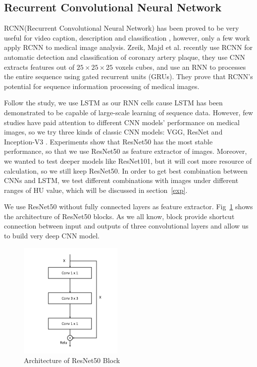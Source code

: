 \documentclass[runningheads]{llncs}
\begin{document}
\subsection{Recurrent Convolutional Neural Network}
\label{RCNN}
RCNN(Recurrent Convolutional Neural Network) has been proved to be very useful for video caption, description and classification \cite{Donahue2015Long}\cite{Aafaq2019Spatio}, however, only a few work apply RCNN to medical image analysis. Zreik, Majd et al. \cite{Zreik2018A} recently use RCNN for automatic detection and classification of coronary artery plaque, they use CNN extracts features out of $ 25\times25\times25$ voxels cubes, and  use an RNN to processes the entire sequence using gated recurrent units (GRUs). They prove that RCNN's potential for sequence information processing of medical images.

Follow the study\cite{Donahue2015Long}, we use LSTM as our RNN cells cause LSTM has been demonstrated to be capable of large-scale learning of sequence data. However, few studies have paid attention to different CNN models' performance on medical images, so we try three kinds of classic CNN models: VGG\cite{simonyan2015very}, ResNet\cite{he2016deep} and Inception-V3 \cite{szegedy2016rethinking}. Experiments show that ResNet50 has the most stable performance, so that we use ResNet50 as feature extractor of images. Moreover, we wanted to test deeper models like ResNet101, but it will cost more resource of calculation, so we still keep ResNet50.
In order to get best combination between CNNs and LSTM, we test different combinations with images under different ranges of HU value, which will be discussed in section~\ref{exp}.

We use ResNet50 without fully connected layers as feature extractor. Fig~\ref{resnetall} shows the architecture of ResNet50 blocks. As we all know, block provide shortcut connection between input and outputs of three convolutional layers and allow us to build very deep CNN model.

\begin{figure}[htb]
    \caption{Architecture of ResNet50 Block}
    \centerline{\includegraphics[width=50mm]{resnet.pdf}}
    \vspace{-0cm}
    \vspace{-0cm}
    \label{resnetall}
    \end{figure}
\end{document}
